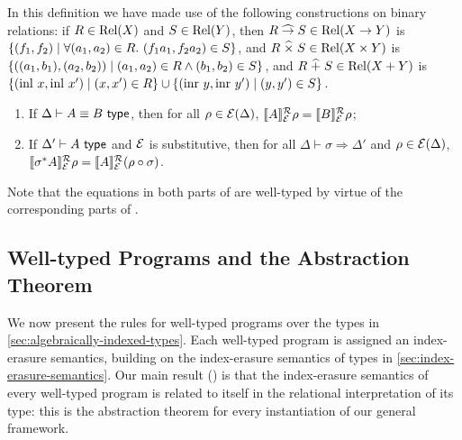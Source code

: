In this definition we have made use of the following %
constructions on binary relations: if $R \in \mathrm{Rel}(X)$ and $S \in
\mathrm{Rel}(Y)$, then $R \mathrel{\widehat\to} S \in \mathrm{Rel}(X \to Y)$ is %
$\{(f_1,f_2) \mathrel| \forall (a_1,a_2) \in R.\ (f_1a_1,f_2a_2) \in S
\}$, and %
$R
\mathrel{\widehat\times} S \in \mathrm{Rel}(X \times Y)$ is %
$\{((a_1,b_1),(a_2,b_2)) \mathrel| (a_1,a_2) \in R \land (b_1,b_2) \in S
\}$, and %
$R \mathrel{\widehat+} S \in \mathrm{Rel}(X + Y)$ is %
$\{ (\mathrm{inl}\ x, \mathrm{inl}\ x') \mathrel| (x,x') \in R \} \cup
\{ (\mathrm{inr}\ y, \mathrm{inr}\ y') \mathrel| (y,y') \in S \}$.

\begin{lemma}\label{lem:tyeqsubst-relational}
\par
  \begin{enumerate}
  \item If $\Delta \vdash A \equiv B \textup{\textsf{ type}}$, then for all $\rho \in
    \mathcal{E}(\Delta)$, $\llbracket A \rrbracket^{\mathcal{R}}_{\mathcal{E}}{\rho} =
    \llbracket B \rrbracket^{\mathcal{R}}_{\mathcal{E}}{\rho}$;
  \item If $\Delta' \vdash A \textup{\textsf{ type}}$ and $\mathcal{E}$ is
    substitutive, then for all $\Delta \vdash \sigma \Rightarrow
    \Delta'$ and $\rho \in \mathcal{E}(\Delta)$,
    $\llbracket \sigma^*A \rrbracket^{\mathcal{R}}_{\mathcal{E}}{\rho} = \llbracket A \rrbracket^{\mathcal{R}}_{\mathcal{E}}{(}\rho
    \circ \sigma)$.
  \end{enumerate}
\end{lemma}
\noindent
Note that the equations in both parts of
 are well-typed by virtue of the
corresponding parts of .


\subsection{Well-typed Programs and the Abstraction Theorem}
\label{sec:well-typed-programs}

We now present the rules for well-typed programs over the 
types %
in \autoref{sec:algebraically-indexed-types}. Each
well-typed program is assigned an index-erasure semantics, building on
the index-erasure semantics of types %
in \autoref{sec:index-erasure-semantics}. Our main result
() is that the index-erasure semantics of
every well-typed program is related to itself in the relational
interpretation of its type: this is the abstraction theorem for every
instantiation of our general framework.

